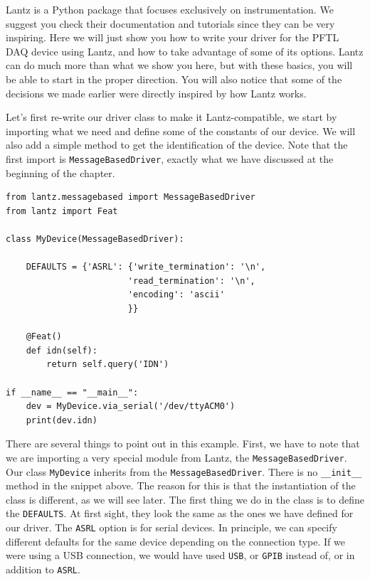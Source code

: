 Lantz is a Python package that focuses exclusively on instrumentation. We suggest you check their documentation and tutorials since they can be very inspiring. Here we will just show you how to write your driver for the {PFTL DAQ} device using Lantz, and how to take advantage of some of its options. Lantz can do much more than what we show you here, but with these basics, you will be able to start in the proper direction. You will also notice that some of the decisions we made earlier were directly inspired by how Lantz works.

Let's first re-write our driver class to make it Lantz-compatible, we start by importing what we need and define some of the constants of our device. We will also add a simple method to get the identification of the device. Note that the first import is \texttt{MessageBasedDriver}, exactly what we have discussed at the beginning of the chapter.

\begin{verbatim}
from lantz.messagebased import MessageBasedDriver
from lantz import Feat

class MyDevice(MessageBasedDriver):

    DEFAULTS = {'ASRL': {'write_termination': '\n',
                        'read_termination': '\n',
                        'encoding': 'ascii'
                        }}

    @Feat()
    def idn(self):
        return self.query('IDN')

if __name__ == "__main__":
    dev = MyDevice.via_serial('/dev/ttyACM0')
    print(dev.idn)
\end{verbatim}

There are several things to point out in this example. First, we have to note that we are importing a very special module from Lantz, the \texttt{MessageBasedDriver}. Our class \texttt{MyDevice} inherits from the \texttt{MessageBasedDriver}. There is no \texttt{__init__} method in the snippet above. The reason for this is that the instantiation of the class is different, as we will see later. The first thing we do in the class is to define the \texttt{DEFAULTS}. At first sight, they look the same as the ones we have defined for our driver. The \texttt{ASRL} option is for serial devices. In principle, we can specify different defaults for the same device depending on the connection type. If we were using a {USB} connection, we would have used \texttt{USB}, or \texttt{GPIB} instead of, or in
addition to \texttt{ASRL}.

